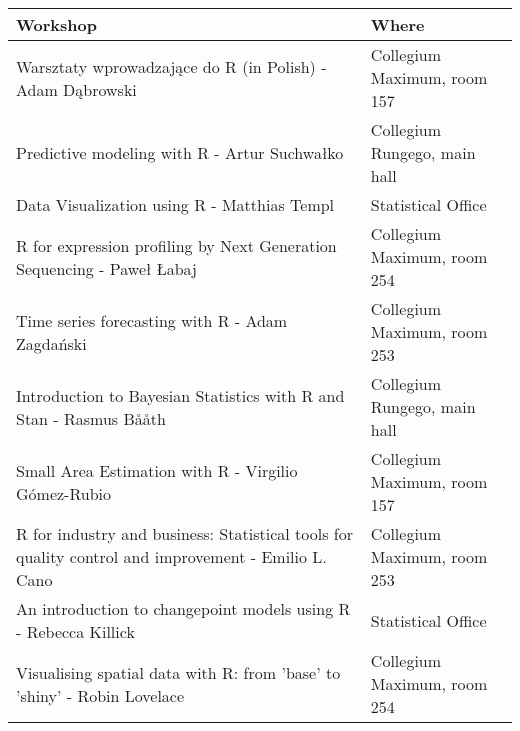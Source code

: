 \begingroup\fontsize{9pt}{10pt}\selectfont
\begin{longtable}{|p{11.1cm}|p{4.6cm}|}
  \hline
Workshop & Where \\ 
  \hline
Warsztaty wprowadzające do R (in Polish) - Adam Dąbrowski & Collegium Maximum, room 157 \\ 
  Predictive modeling with R - Artur Suchwałko & Collegium Rungego, main hall \\ 
  Data Visualization using R - Matthias Templ & Statistical Office \\ 
  R for expression profiling by Next Generation Sequencing - Paweł Łabaj & Collegium Maximum, room 254 \\ 
  Time series forecasting with R - Adam Zagdański & Collegium Maximum, room 253 \\ 
  Introduction to Bayesian Statistics with R and Stan - Rasmus Bååth & Collegium Rungego, main hall \\ 
  Small Area Estimation with R - Virgilio Gómez-Rubio & Collegium Maximum, room 157 \\ 
  R for industry and business: Statistical tools for quality control and improvement - Emilio L. Cano & Collegium Maximum, room 253 \\ 
  An introduction to changepoint models using R - Rebecca Killick & Statistical Office \\ 
  Visualising spatial data with R: from 'base' to 'shiny' - Robin Lovelace & Collegium Maximum, room 254 \\ 
   \hline
\end{longtable}
\endgroup
